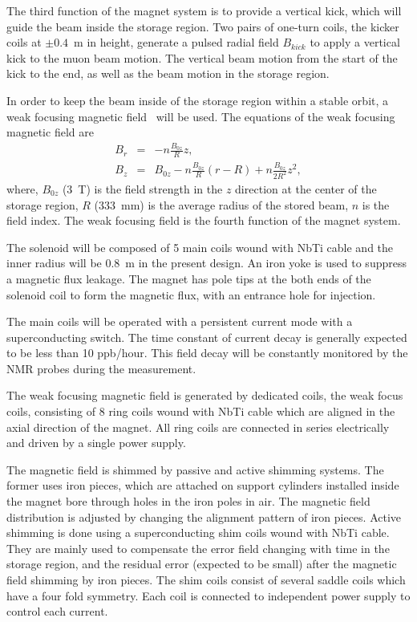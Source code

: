 The third function of the magnet system is to provide a vertical kick, which will guide the beam inside the storage region.
Two pairs of one-turn coils, the kicker coils at $\pm0.4$~m in height, 
generate a pulsed radial field $B_{kick}$ to apply a vertical kick to the muon beam motion. 
The vertical beam motion from the start of the kick to the end, as well as the beam motion in the storage region.

In order to keep the beam inside of the storage region within a stable orbit,
a weak focusing magnetic field~\cite{Iinuma:2016zfu,Abe:2018tmp} will be used.
The equations of the weak focusing magnetic field are 
\begin{eqnarray}
 B_r &=& -n\frac{B_{0z}}{R}z, \\
 B_z &=& B_{0z}-n\frac{B_{0z}}{R}(r-R)+ n\frac{B_{0z}}{2R^2}z^2,  
\label{eq:weak}
\end{eqnarray}
where, $B_{0z}$ (3~T) is the field strength in the $z$ direction at the center of the storage region,
$R$ (333~mm) is the average radius of the stored beam, $n$ is the field index.
The weak focusing field is the fourth function of the magnet system.

The solenoid will be composed of 5 main coils wound with NbTi cable
and the inner radius will be 0.8~m in the present design.
An iron yoke is used to suppress a magnetic flux leakage.
The magnet has pole tips at the both ends of the solenoid coil to form the magnetic flux, with an entrance hole for injection.

The main coils will be operated with a persistent current mode with a superconducting switch.
The time constant of current decay is generally expected to be less than 10 ppb/hour.
This field decay will be constantly monitored by the NMR probes during the measurement.

The weak focusing magnetic field is generated by dedicated coils, the weak focus coils, consisting
 of 8 ring coils wound with NbTi cable which are aligned in the axial direction of the magnet.
All ring coils are connected in series electrically and driven by a single power supply.

The magnetic field is shimmed by passive and active shimming systems.
The former uses iron pieces,
which are attached on support cylinders installed inside the magnet bore through holes in the iron poles in air.
The magnetic field distribution is adjusted by changing the alignment pattern of iron pieces.
Active shimming is done using a superconducting shim coils wound with NbTi cable.
They are mainly used to compensate the error field changing with time in the storage region,
and the residual error (expected to be small) after the magnetic field shimming by iron pieces.
The shim coils consist of several saddle coils which have a four fold symmetry.
Each coil is connected to independent power supply to control each current.

